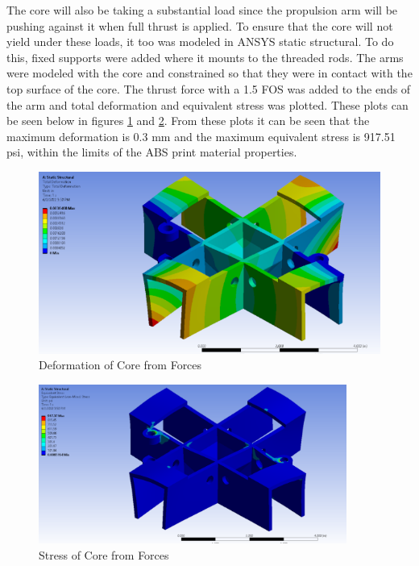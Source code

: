 The core will also be taking a substantial load since the propulsion arm will be pushing against it when full thrust is applied. To ensure that the core will not yield under these loads, it too was modeled in ANSYS static structural. To do this, fixed supports were added where it mounts to the threaded rods. The arms were modeled with the core and constrained so that they were in contact with the top surface of the core. The thrust force with a 1.5 FOS was added to the ends of the arm and total deformation and equivalent stress was plotted. These plots can be seen below in figures \ref{fig:CoreDef} and \ref{fig:CoreDef2}. From these plots it can be seen that the maximum deformation is 0.3 mm and the maximum equivalent stress is 917.51 psi, within the limits of the ABS print material properties. 

\begin{figure}[H]
    \centering
    \includegraphics[width=\textwidth]{src/figs/CoreAnsys.png}
    \caption{Deformation of Core from Forces}
    \label{fig:CoreDef}
\end{figure}

\begin{figure}[H]
    \centering
    \includegraphics[width=0.9\textwidth]{src/figs/CoreAnsys2.png}
    \caption{Stress of Core from Forces}
    \label{fig:CoreDef2}
\end{figure}



